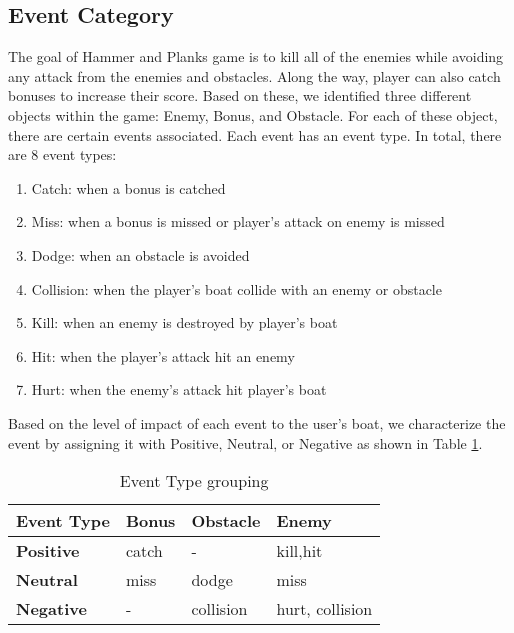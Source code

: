 \subsection{Event Category}
The goal of Hammer and Planks game is to kill all of the enemies while avoiding any attack from the enemies and obstacles\cite{diloreto}. Along the way, player can also catch bonuses to increase their score. Based on these, we identified three different objects within the game: Enemy, Bonus, and Obstacle. For each of these object, there are certain events associated. Each event has an event type. In total, there are 8 event types:
\newcommand{\events}[2]{$#1 _ #2$}	
\begin{enumerate}[label=({\arabic*})]
\item Catch: when a bonus is catched
\item Miss: when a bonus is missed or player's attack on enemy is missed
\item Dodge: when an obstacle is avoided
\item Collision: when the player's boat collide with an enemy or obstacle
\item Kill: when an enemy is destroyed by player's boat
\item Hit: when the player's attack hit an enemy
\item Hurt: when the enemy's attack hit player's boat
\end{enumerate}

Based on the level of impact of each event to the user's boat, we characterize the event by assigning it with Positive, Neutral, or Negative as shown in Table \ref{tblEventType}.
\begin{table}[h]
\begin{center}
    \begin{tabular}{| l | l | l | l |}
    \hline
    Event Type & Bonus & Obstacle & Enemy \\ \hline\hline
    \textbf{Positive} & catch & - & kill,hit\\ \hline
    \textbf{Neutral} & miss & dodge & miss\\ \hline
    \textbf{Negative} & - & collision & hurt, collision\\
    \hline
    \end{tabular}
    \caption {Event Type grouping}
    \label{tblEventType}
\end{center}
\end{table}

